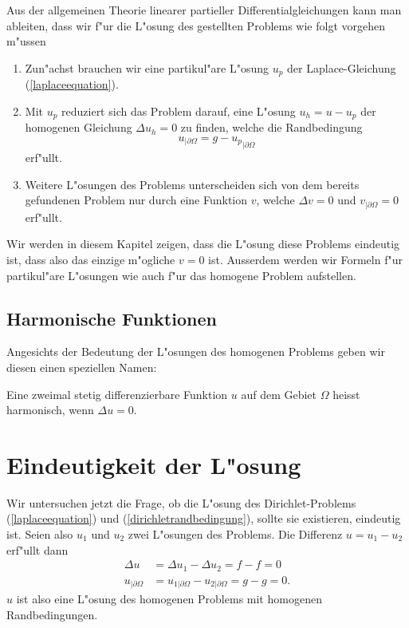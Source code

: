 Aus der allgemeinen Theorie linearer partieller Differentialgleichungen
kann man ableiten, dass wir f"ur
die L"osung des gestellten Problems wie folgt vorgehen m"ussen
\begin{enumerate}
\item Zun"achst brauchen wir eine partikul"are
L"osung $u_p$ der Laplace-Gleichung (\ref{laplaceequation}).
\item Mit $u_p$ reduziert sich das Problem darauf, eine L"osung
$u_h=u-u_p$ der homogenen Gleichung $\Delta u_h=0$
zu finden, welche die Randbedingung
\[
u_{|\partial\Omega}=g-{u_p}_{|\partial\Omega}
\]
erf"ullt.
\item
Weitere L"osungen des Problems unterscheiden sich von dem
bereits gefundenen Problem nur durch eine Funktion $v$, welche
$\Delta v=0$ und $v_{|\partial\Omega}=0$ erf"ullt.
\end{enumerate}
Wir werden in diesem Kapitel zeigen, dass die L"osung diese Problems
eindeutig ist, dass also das einzige m"ogliche $v=0$ ist.
Ausserdem werden wir Formeln f"ur partikul"are L"osungen wie auch f"ur
das homogene Problem aufstellen.

\subsection{Harmonische Funktionen}
Angesichts der Bedeutung der L"osungen des homogenen Problems
geben wir diesen einen speziellen Namen:

\begin{definition}
Eine zweimal stetig differenzierbare Funktion $u$ auf dem Gebiet $\Omega$
heisst harmonisch, wenn $\Delta u=0$.
\end{definition}

\section{Eindeutigkeit der L"osung}
Wir untersuchen jetzt die Frage, ob die L"osung des 
Dirichlet-Problems (\ref{laplaceequation}) und
(\ref{dirichletrandbedingung}), sollte sie existieren, eindeutig ist.
Seien also $u_1$ und $u_2$ zwei L"osungen des Problems. Die Differenz
$u=u_1-u_2$ erf"ullt dann
\begin{align*}
\Delta u&=\Delta u_1-\Delta u_2=f-f=0\\
u_{|\partial\Omega}&=u_{1|\partial\Omega}-u_{2|\partial\Omega}=g-g=0.
\end{align*}
$u$ ist also eine L"osung des homogenen Problems mit homogenen
Randbedingungen.

